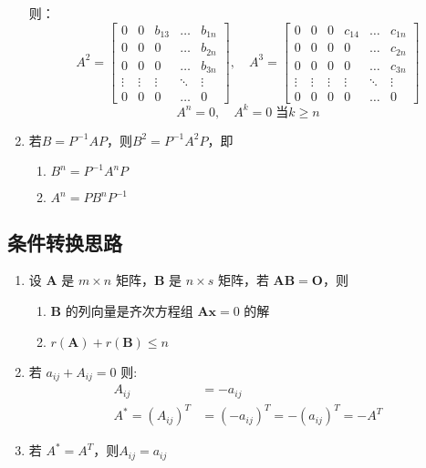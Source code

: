 \documentclass[a4paper,12pt]{article}
\begin{document}
\begin{enumerate}
        则：
        \[
            A^2 =
            \begin{bmatrix}
                0      & 0      & b_{13} & \dots  & b_{1n} \\
                0      & 0      & 0      & \dots  & b_{2n} \\
                0      & 0      & 0      & \dots  & b_{3n} \\
                \vdots & \vdots & \vdots & \ddots & \vdots \\
                0      & 0      & 0      & \dots  & 0
            \end{bmatrix}, \quad
            A^3 =
            \begin{bmatrix}
                0      & 0      & 0      & c_{14} & \dots  & c_{1n} \\
                0      & 0      & 0      & 0      & \dots  & c_{2n} \\
                0      & 0      & 0      & 0      & \dots  & c_{3n} \\
                \vdots & \vdots & \vdots & \vdots & \ddots & \vdots \\
                0      & 0      & 0      & 0      & \dots  & 0
            \end{bmatrix}
        \]
        \[
            A^n = 0, \quad A^k = 0 \; \text{当} k \ge n
        \]
        \item 若$B = P^{-1}AP$，则$B^2 = P^{-1}A^{2}P$，即
        \begin{enumerate}
            \item $B^n = P^{-1}A^{n}P$
            \item $A^n = PB^{n}P^{-1}$
        \end{enumerate}
    \end{enumerate}

    \subsection{条件转换思路}

    \begin{enumerate}
        \item 设 $\mathbf{A}$ 是 $m \times n$ 矩阵，$\mathbf{B}$ 是 $n \times s$ 矩阵，若 $\mathbf{AB} = \mathbf{O}$，则
        \begin{enumerate}
            \item $\mathbf{B}$ 的列向量是齐次方程组 $\mathbf{Ax} = 0$ 的解
            \item $r(\mathbf{A}) + r(\mathbf{B}) \le n$
        \end{enumerate}
        \item 若 $a_{ij} + A_{ij} = 0$ 则:
        \[
            \begin{aligned}
                A_{ij} &= -a_{ij} \\
                A^* = (A_{ij})^T &= (-a_{ij})^T = -(a_{ij})^T = -A^T
            \end{aligned}
        \]
        \item 若 $A^* = A^T$，则$A_{ij} = a_{ij}$
    \end{enumerate}
\end{document}
